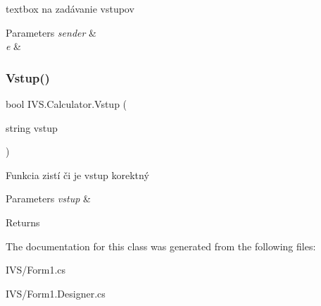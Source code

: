 textbox na zadávanie vstupov 


\begin{DoxyParams}{Parameters}
{\em sender} & \\
\hline
{\em e} & \\
\hline
\end{DoxyParams}
\mbox{\label{class_i_v_s_1_1_calculator_a1f5a3ec0d3225879502a138d6ce14dec}} 
\subsubsection{\texorpdfstring{Vstup()}{Vstup()}}
{\footnotesize\ttfamily bool I\+V\+S.\+Calculator.\+Vstup (\begin{DoxyParamCaption}\item[{string}]{vstup }\end{DoxyParamCaption})\hspace{0.3cm}{\ttfamily [protected]}}



Funkcia zistí či je vstup korektný 


\begin{DoxyParams}{Parameters}
{\em vstup} & \\
\hline
\end{DoxyParams}
\begin{DoxyReturn}{Returns}

\end{DoxyReturn}


The documentation for this class was generated from the following files\+:\begin{DoxyCompactItemize}
\item 
I\+V\+S/Form1.\+cs\item 
I\+V\+S/Form1.\+Designer.\+cs\end{DoxyCompactItemize}
